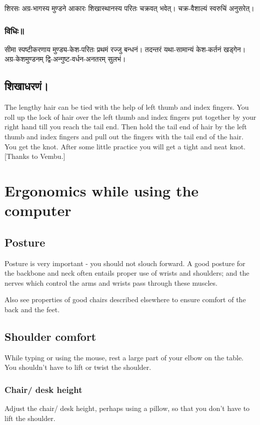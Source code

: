 \documentclass[oneside, article]{memoir}
\begin{document}
शिरसः अग्र-भागस्य मुण्डने आकारः शिखास्थानस्य परितः चक्रवत् भवेत्। चक्र-वैशाल्यं स्वरुचिं अनुसरेत्।

\subsection{विधिः॥}
सीमा स्पष्टीकरणाय मुण्ड्य-केश-परितः प्रथमं रज्जु बन्धनं। तदन्तरं यथा-सामान्यं केश-कर्तनं खड्गेन।
अग्र-केशमुण्डनम् द्वि-अन्गुष्ट-वर्धन-अनतरम् सुलभं।

\section{शिखाधरणं।}


The lengthy hair can be tied with the help of left thumb and index fingers. You roll up the lock of hair over the left thumb and index fingers put together by your right hand till you reach the tail end. Then hold the tail end of hair by the left thumb and index fingers and pull out the fingers with the tail end of the hair. You get the knot. After some little practice you will get a tight and neat knot. [Thanks to Vembu.]

\chapter{Ergonomics while using the computer}
\section{Posture}
Posture is very important - you should not slouch forward. A good posture for the backbone and neck often entails proper use of wrists and shoulders; and the nerves which control the arms and wrists pass through these muscles.

Also see properties of good chairs described elsewhere to ensure comfort of the back and the feet.

\section{Shoulder comfort}
While typing or using the mouse, rest a large part of your elbow on the table. You shouldn't have to lift or twist the shoulder.

\subsection{Chair/ desk height}
Adjust the chair/ desk height, perhaps using a pillow, so that you don't have to lift the shoulder.
\end{document}
